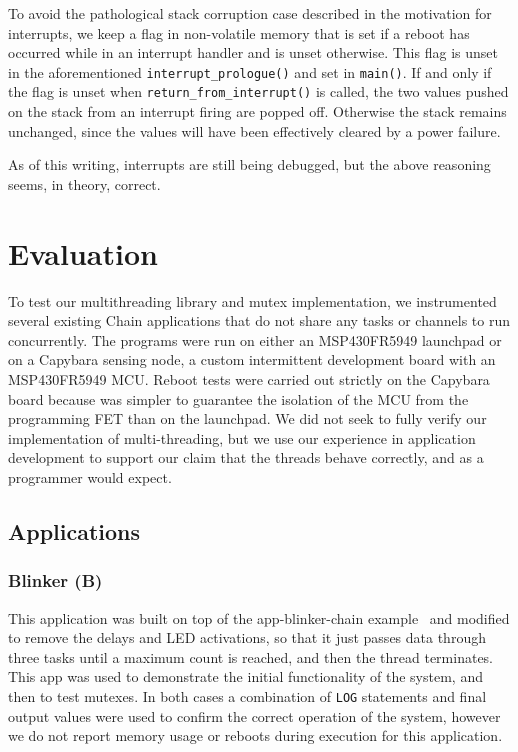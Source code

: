 \documentclass[11pt]{sensys-proc}
\begin{document}
To avoid the pathological stack corruption case described in the motivation for
interrupts, we keep a flag in non-volatile memory that is set if a reboot has
occurred while in an interrupt handler and is unset otherwise. This flag is
unset in the aforementioned \texttt{interrupt\_prologue()} and set in
\texttt{main()}. If and only if the flag is unset when
\texttt{return\_from\_interrupt()} is called, the two values pushed on the
stack from an interrupt firing are popped off. Otherwise the stack remains
unchanged, since the values will have been effectively cleared by a power
failure.


As of this writing, interrupts are still being debugged, but the above
reasoning seems, in theory, correct.


\section{Evaluation}
To test our multithreading library and mutex implementation, we instrumented
several existing Chain applications that do not share any tasks or channels to
run concurrently. The programs were run on either an MSP430FR5949 launchpad or
on a Capybara sensing node, a custom intermittent development board with an
MSP430FR5949 MCU. Reboot tests were carried out strictly on the Capybara board
because was simpler to guarantee the isolation of the MCU from the programming
FET than on the launchpad. We did not seek to fully verify our implementation
of multi-threading, but we use our experience in application development to
support our claim that the threads behave correctly, and as a programmer would
expect.

\subsection{Applications}
\subsubsection{Blinker (B)}
This application was built on top of the app-blinker-chain
example~\cite{blinker} and modified to remove the delays and LED activations, so
that it just passes data through three tasks until a maximum count is reached,
and then the thread terminates. This app was used to demonstrate the
initial functionality of the system, and then to test mutexes. In both cases a
combination of \texttt{LOG} statements and final output values were used to
confirm the correct operation of the system, however we do not report memory
usage or reboots during execution for this application. 
\end{document}
